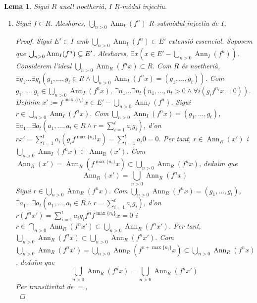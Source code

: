 \documentclass[compress]{article}
\newtheorem{lema}{Lema}
\theoremstyle{definition}
\DeclareMathOperator{\Ann}{Ann}
\begin{document}
\begin{lema}
    Sigui $R$ anell noetherià, $I$ $R$-mòdul injectiu.
    \begin{enumerate}
        \item Sigui $f\in R$. Aleshores, $\bigcup_{n>0}\Ann_{I}(f^{n})$ $R$-submòdul injectiu de $I$.
        \begin{proof}
            Sigui $E'\subset I$ amb $\bigcup_{n>0}\Ann_{I}(f^{n})\subset E'$ extensió essencial. Suposem que $\bigcup_{n>0}\Ann_{I}(f^{n})\newline\subsetneq E'$. Aleshores, $\exists x(x\in E'-\bigcup_{n>0}\Ann_{I}(f^{n}))$. Considerem l'ideal $\bigcup_{n>0}\Ann_{R}(f^{n}x)\subset R$. Com $R$ és noetherià, $\exists g_{1}\ldots\exists g_{t}(g_{1},\ldots,g_{t}\in R\land\bigcup_{n>0}\Ann_{I}(f^{n}x)=(g_{1},\ldots,g_{t}))$. Com $g_{1},\ldots,g_{t}\in\bigcup_{n>0}\Ann_{I}(f^{n}x)$, $\exists n_{1}\ldots\exists n_{t}(n_{1},\ldots,n_{t}>0\land\forall i(g_{i}f^{n_{i}}x=0))$. Definim $x':=f^{\max\{n_{i}\}}x\in E'-\bigcup_{n>0}\Ann_{I}(f^{n})$. Sigui $r\in\bigcup_{n>0}\Ann_{I}(f^{n}x)$. Com $\bigcup_{n>0}\Ann_{I}(f^{n}x)=(g_{1},\ldots,g_{t})$, $\exists a_{1}\ldots\exists a_{t}(a_{1},\ldots,a_{t}\in R\land r=\sum_{i=1}^{t}a_{i}g_{i})$, d'on $rx'=\sum_{i=1}^{t}a_{i}(g_{i}f^{\max\{n_{i}\}}x)=\sum_{i=1}^{t}a_{i}0=0$. Per tant, $r\in\Ann_{R}(x')$ i $\bigcup_{n>0}\Ann_{I}(f^{n}x)\subset\Ann_{R}(x')$. Com $\Ann_{R}(x')=\Ann_{R}(f^{\max\{n_{i}\}}x)\subset\bigcup_{n>0}\Ann_{R}(f^{n}x)$, deduïm que
            \begin{equation*}
                \Ann_{R}(x')
                =\bigcup_{n>0}\Ann_{R}(f^{n}x)
            \end{equation*}
            Sigui $r\in\bigcup_{n>0}\Ann_{R}(f^{n}x)$. Com $\bigcup_{n>0}\Ann_{R}(f^{n}x)=(g_{1},\ldots,g_{t})$, $\exists a_{1}\ldots\exists a_{t}(a_{1},\ldots,a_{t}\in R\land r=\sum_{i=1}^{t}a_{i}g_{i})$, d'on $r(f^{n}x')=\sum_{i=1}^{t}a_{i}g_{i}f^{n}f^{\max\{n_{i}\}}x=0$ i $r\in\bigcap_{n>0}\Ann_{R}(f^{n}x')\subset\bigcup_{n>0}\Ann_{R}(f^{n}x')$. Per tant, $\bigcup_{n>0}\Ann_{R}(f^{n}x)\subset\bigcup_{n>0}\Ann_{R}(f^{n}x')$. Com $\bigcup_{n>0}\Ann_{R}(f^{n}x')=\bigcup_{n>0}\Ann_{R}(f^{n+\max\{n_{i}\}}x)\subset\bigcup_{n>0}\Ann_{R}(f^{n}x)$, deduïm que
            \begin{equation*}
                \bigcup_{n>0}\Ann_{R}(f^{n}x)
                =\bigcup_{n>0}\Ann_{R}(f^{n}x')
            \end{equation*}
            Per transitivitat de $=$,
            \begin{equation*}

\end{equation*}
\end{proof}
\end{enumerate}
\end{lema}
\end{document}
